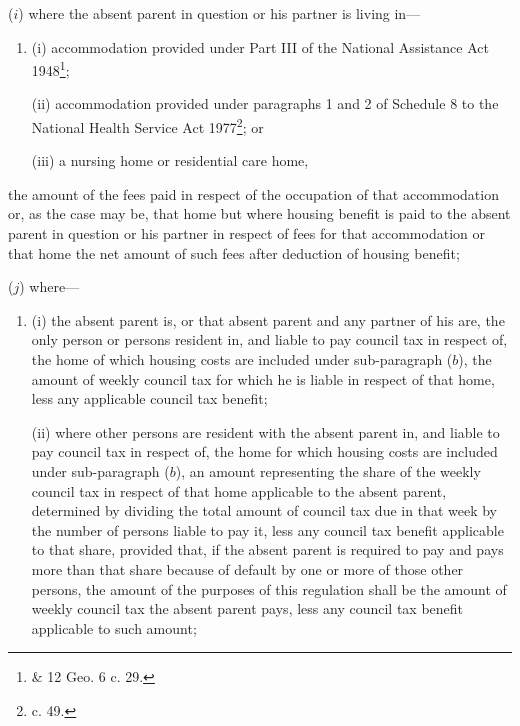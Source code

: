 \documentclass[12pt,a4paper]{article}
\begin{document}
\begin{enumerate}
($i$) where the absent parent in question or his partner is living in—
\begin{enumerate}\item[]
(i) accommodation provided under Part III of the National Assistance Act 1948\footnote{ \& 12 Geo. 6 c. 29.};

(ii) accommodation provided under paragraphs 1 and 2 of Schedule 8 to the National Health Service Act 1977\footnote{ c. 49.}; or

(iii) a nursing home or residential care home,
\end{enumerate}
the amount of the fees paid in respect of the occupation of that accommodation or, as the case may be, that home
but where housing benefit is paid to the absent parent in question or his partner in respect of fees for that accommodation or that home the net amount of such fees after deduction of housing benefit;  %


($j$) where—
\begin{enumerate}\item[]
(i) the absent parent is, or that absent parent and any partner of his are, the only person or persons resident in, and liable to pay council tax in respect of, the home of which housing costs are included under sub-paragraph ($b$), the amount of weekly council tax for which he is liable in respect of that home, less any applicable council tax benefit;

(ii) where other persons are resident with the absent parent in, and liable to pay council tax in respect of, the home for which housing costs are included under sub-paragraph ($b$), an amount representing the share of the weekly council tax in respect of that home applicable to the absent parent, determined by dividing the total amount of council tax due in that week by the number of persons liable to pay it, less any council tax benefit applicable to that share, provided that, if the absent parent is required to pay and pays more than that share because of default by one or more of those other persons, the amount of the purposes of this regulation shall be the amount of weekly council tax the absent parent pays, less any council tax benefit applicable to such amount;
\end{enumerate}


\end{enumerate}
\end{document}
